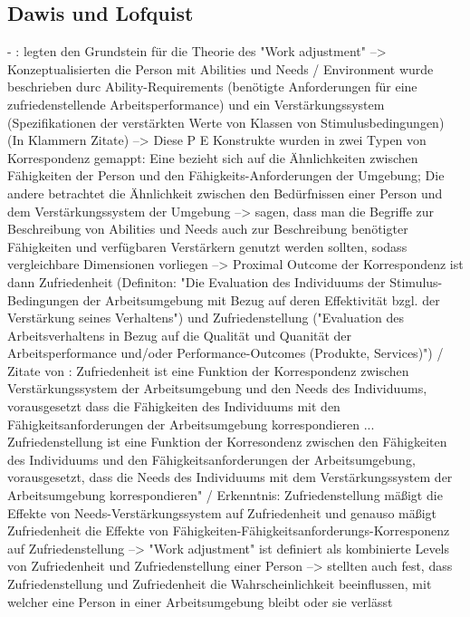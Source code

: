 \subsection{Dawis und Lofquist}
\label{ch:notizen:beruflicheKongruenz:dawisUndLofquist}
- \cite[S. 28f.]{edwards:2008}: \textcite{workAdjustment:1964} legten den Grundstein für die Theorie des "Work adjustment" --> Konzeptualisierten die Person mit Abilities und Needs / Environment wurde beschrieben durc Ability-Requirements (benötigte Anforderungen für eine zufriedenstellende Arbeitsperformance) und ein Verstärkungssystem (Spezifikationen der verstärkten Werte von Klassen von Stimulusbedingungen) (In Klammern Zitate) --> Diese P E Konstrukte wurden in zwei Typen von Korrespondenz gemappt: Eine bezieht sich auf die Ähnlichkeiten zwischen Fähigkeiten der Person und den Fähigkeits-Anforderungen der Umgebung; Die andere betrachtet die Ähnlichkeit zwischen den Bedürfnissen einer Person und dem Verstärkungssystem der Umgebung --> \textcite{workAdjustment:1964} sagen, dass man die Begriffe zur Beschreibung von Abilities und Needs auch zur Beschreibung benötigter Fähigkeiten und verfügbaren Verstärkern genutzt werden sollten, sodass vergleichbare Dimensionen vorliegen --> Proximal Outcome der Korrespondenz ist dann Zufriedenheit (Definiton: "Die Evaluation des Individuums der Stimulus-Bedingungen der Arbeitsumgebung mit Bezug auf deren Effektivität bzgl. der Verstärkung seines Verhaltens") und Zufriedenstellung ("Evaluation des Arbeitsverhaltens in Bezug auf die Qualität und Quanität der Arbeitsperformance und/oder Performance-Outcomes (Produkte, Services)") / Zitate von \cite{workAdjustment:1964}: Zufriedenheit ist eine Funktion der Korrespondenz zwischen Verstärkungssystem der Arbeitsumgebung und den Needs des Individuums, vorausgesetzt dass die Fähigkeiten des Individuums mit den Fähigkeitsanforderungen der Arbeitsumgebung korrespondieren ... Zufriedenstellung ist eine Funktion der Korresondenz zwischen den Fähigkeiten des Individuums und den Fähigkeitsanforderungen der Arbeitsumgebung, vorausgesetzt, dass die Needs des Individuums mit dem Verstärkungssystem der Arbeitsumgebung korrespondieren" / Erkenntnis: Zufriedenstellung mäßigt die Effekte von Needs-Verstärkungssystem auf Zufriedenheit und genauso mäßigt Zufriedenheit die Effekte von Fähigkeiten-Fähigkeitsanforderungs-Korresponenz auf Zufriedenstellung --> "Work adjustment" ist definiert als kombinierte Levels von Zufriedenheit und Zufriedenstellung einer Person --> \cite{workAdjustment:1964} stellten auch fest, dass Zufriedenstellung und Zufriedenheit die Wahrscheinlichkeit beeinflussen, mit welcher eine Person in einer Arbeitsumgebung bleibt oder sie verlässt \\
